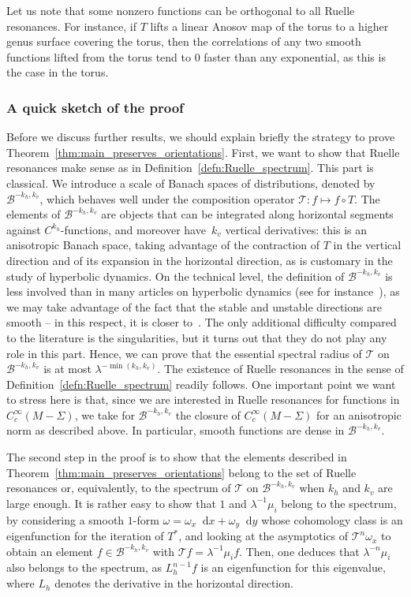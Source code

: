 \documentclass[10pt]{amsart}
\newcommand{\boB}{\mathcal{B}}
\newcommand{\boT}{\mathcal{T}}
\newcommand{\dd}{\mathop{}\!\mathrm{d}}
\theoremstyle{definition}
\numberwithin{equation}{section}
\begin{document}
Let us note that some nonzero functions can be orthogonal to all Ruelle resonances. For instance,
if $T$ lifts a linear Anosov map of the torus to a higher genus surface covering
the torus, then the correlations of any two smooth functions lifted from the torus
tend to $0$ faster than any exponential, as this is the case in the torus.

\subsubsection*{A quick sketch of the proof}
Before we discuss further results, we should explain briefly the strategy to
prove Theorem~\ref{thm:main_preserves_orientations}. First, we want to show
that Ruelle resonances make sense as in
Definition~\ref{defn:Ruelle_spectrum}. This part is classical. We introduce a
scale of Banach spaces of distributions, denoted by $\boB^{-k_h, k_v}$, which
behaves well under the composition operator $\boT : f \mapsto f \circ T$. The
elements of $\boB^{-k_h, k_v}$ are objects that can be integrated along
horizontal segments against $C^{k_h}$-functions, and moreover have~$k_v$
vertical derivatives: this is an anisotropic Banach space, taking advantage
of the contraction of $T$ in the vertical direction and of its expansion in
the horizontal direction, as is customary in the study of hyperbolic
dynamics. On the technical level, the definition of $\boB^{-k_h, k_v}$ is
less involved than in many articles on hyperbolic dynamics (see for
instance~\cite{GL_Anosov2, bt_aniso}), as we may take advantage of the fact
that the stable and unstable directions are smooth -- in this respect, it is
closer to~\cite{baladi_Cinfty, avila_gouezel}. The only additional difficulty
compared to the literature is the singularities, but it turns out that they
do not play any role in this part. Hence, we can prove that the essential
spectral radius of $\boT$ on $\boB^{-k_h, k_v}$ is at most
$\lambda^{-\min(k_h, k_v)}$. The existence of Ruelle resonances in the sense
of Definition~\ref{defn:Ruelle_spectrum} readily follows. One important point
we want to stress here is that, since we are interested in Ruelle resonances
for functions in $C^\infty_c(M-\Sigma)$, we take for $\boB^{-k_h, k_v}$ the
closure of $C^\infty_c(M-\Sigma)$ for an anisotropic norm as described above.
In particular, smooth functions are dense in $\boB^{-k_h, k_v}$.

The second step in the proof is to show that the elements described in
Theorem~\ref{thm:main_preserves_orientations} belong to the set of Ruelle
resonances or, equivalently, to the spectrum of $\boT$ on $\boB^{-k_h, k_v}$
when $k_h$ and $k_v$ are large enough. It is rather easy to show that $1$ and
$\lambda^{-1} \mu_i$ belong to the spectrum, by considering a smooth $1$-form
$\omega = \omega_x \dd x + \omega_y \dd y$ whose cohomology class is an
eigenfunction for the iteration of $T^*$, and looking at the asymptotics of
$\boT^n \omega_x$ to obtain an element $f\in \boB^{-k_h, k_v}$ with $\boT f =
\lambda^{-1} \mu_i f$. Then, one deduces that $\lambda^{-n} \mu_i$ also
belongs to the spectrum, as $L_h^{n-1} f$ is an eigenfunction for this
eigenvalue, where $L_h$ denotes the derivative in the horizontal direction.
\end{document}

